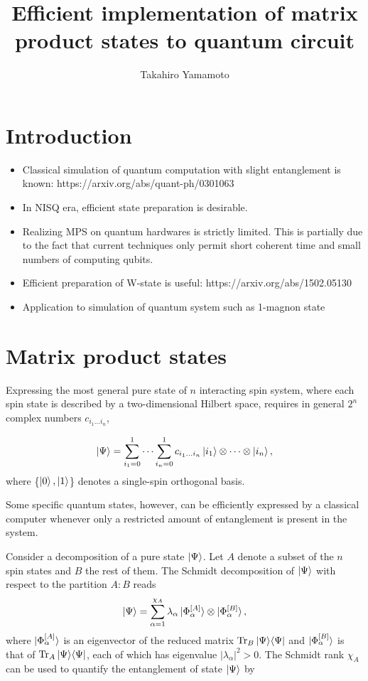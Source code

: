 \documentclass[11pt, oneside]{article}   	%
\title{Efficient implementation of matrix product states to quantum circuit}
\author{Takahiro Yamamoto}
\begin{document}
\maketitle

\section{Introduction}
\begin{itemize}
\item
Classical simulation of quantum computation with slight entanglement is known: https://arxiv.org/abs/quant-ph/0301063
\item
In NISQ era, efficient state preparation is desirable.
\item
Realizing MPS on quantum hardwares is strictly limited. This is partially due to the fact that current techniques only permit short coherent time and small numbers of computing qubits.
\item
Efficient preparation of W-state is useful: https://arxiv.org/abs/1502.05130
\item
Application to simulation of quantum system such as 1-magnon state 
\end{itemize}

\section{Matrix product states}
Expressing the most general pure state of $n$ interacting spin system, 
where each spin state is described by a two-dimensional Hilbert space, 
requires in general $2^n$ complex numbers $c_{i_1 \dots i_n}$,

\begin{equation}
\ket{\Psi} = \sum^1_{i_1 = 0} \cdots \sum^1_{i_n = 0} c_{i_1 \dots i_n} \ket{i_1} \otimes \cdots \otimes \ket{i_n},
\end{equation}
where \{$\ket{0}, \ket{1}$\} denotes a single-spin orthogonal basis.

Some specific quantum states, however, can be efficiently expressed by a classical computer
whenever only a restricted amount of entanglement is present in the system. 

Consider a decomposition of a pure state $\ket{\Psi}$.
Let $A$ denote a subset of the $n$ spin states and $B$ the rest of them.
The Schmidt decomposition of $\ket{\Psi}$ with respect to the partition $A:B$ reads
\begin{equation}
\ket{\Psi} = \sum^{\chi_A}_{\alpha = 1} \lambda_{\alpha} \ket{\Phi^{[A]}_{\alpha}} \otimes \ket{\Phi^{[B]}_{\alpha}},
\end{equation}
where 
$\ket{\Phi^{[A]}_{\alpha}}$ 
is an eigenvector of the reduced matrix 
$\textrm{Tr}_B \ket{\Psi} \! \bra{\Psi}$
and 
$\ket{\Phi^{[B]}_{\alpha}}$ 
is that of 
$\textrm{Tr}_A \ket{\Psi} \! \bra{\Psi}$, 
each of which has eigenvalue $|\lambda_{\alpha}|^2 > 0$.
The Schmidt rank $\chi_A$ can be used to quantify the entanglement of state $\ket{\Psi}$ by
\end{document}

